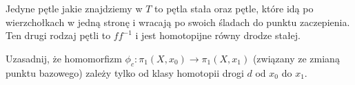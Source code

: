 \begin{solution}
  Jedyne pętle jakie znajdziemy w $T$ to pętla stała oraz pętle, które idą po wierzchołkach w jedną stronę i wracają po swoich śladach do punktu zaczepienia. Ten drugi rodzaj pętli to $ff^{-1}$ i jest homotopijne równy drodze stałej.
\end{solution}

\begin{problem}
  Uzasadnij, że homomorfizm $\phi_c:\pi_1(X, x_0)\to \pi_1(X, x_1)$ (związany ze zmianą punktu bazowego) zależy tylko od klasy homotopii drogi $d$ od $x_0$ do $x_1$.
\end{problem}
